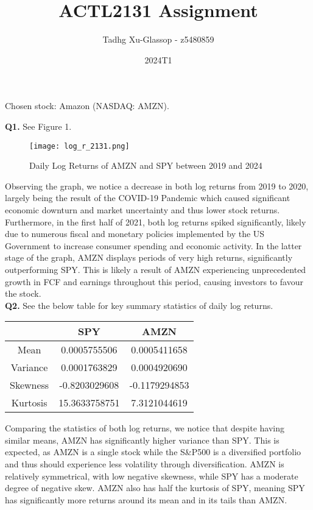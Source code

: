 \documentclass[twocolumn]{article}
\title{ACTL2131 Assignment}
\author{Tadhg Xu-Glassop - z5480859}
\date{2024T1}
\begin{document}
\maketitle
\begin{center}
    Chosen stock: Amazon (NASDAQ: AMZN).
\end{center}

\hspace{1.4cm}\textbf{Q1.} See Figure 1. \\
\begin{figure}[htp]
    \centering
    \texttt{[image: log\_r\_2131.png]}
    \caption{Daily Log Returns of AMZN and SPY between 2019 and 2024}
    \label{fig:galaxy}
\end{figure}

Observing the graph, we notice a decrease in both log returns from 2019 to 2020, largely being the result of the COVID-19 Pandemic which caused significant economic downturn and market uncertainty and thus lower stock returns. Furthermore, in the first half of 2021, both log returns spiked significantly, likely due to numerous fiscal and monetary policies implemented by the US Government to increase consumer spending and economic activity. In the latter stage of the graph, AMZN displays periods of very high returns, significantly outperforming SPY. This is likely a result of AMZN experiencing unprecedented growth in FCF and earnings throughout this period, causing investors to favour the stock. \\

\textbf{Q2.} See the below table for key summary statistics of daily log returns. 
\begin{center}
    \begin{tabular}{c|c|c}
    \hline
     & SPY & AMZN  \\ \hline
    Mean & 0.0005755506 & 0.0005411658 \\ \hline
    Variance & 0.0001763829 & 0.0004920690 \\ \hline
    Skewness & -0.8203029608 & -0.1179294853 \\ \hline
    Kurtosis & 15.3633758751 & 7.3121044619 \\ \hline
    \end{tabular}
\end{center}
Comparing the statistics of both log returns, we notice that despite having similar means, AMZN has significantly higher variance than SPY. This is expected, as AMZN is a single stock while the S\&P500 is a diversified portfolio and thus should experience less volatility through diversification. AMZN is relatively symmetrical, with low negative skewness, while SPY has a moderate degree of negative skew. AMZN also has half the kurtosis of SPY, meaning SPY has significantly more returns around its mean and in its tails than AMZN. \\
\end{document}
